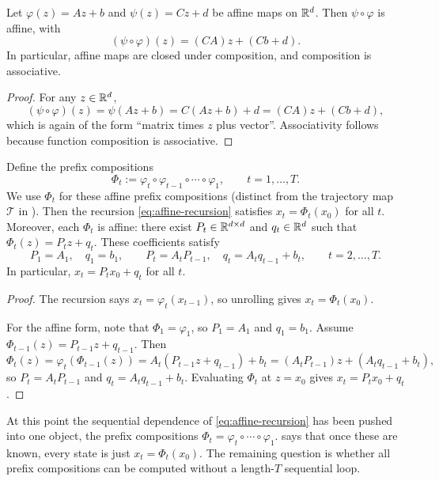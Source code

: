 \documentclass[11pt]{article}
\begin{document}
\begin{lemma}
\label{lem:affine-composition}
Let $\varphi(z)=Az+b$ and $\psi(z)=Cz+d$ be affine maps on $\mathbb{R}^d$.
Then $\psi\circ\varphi$ is affine, with
\[
(\psi\circ\varphi)(z) = (CA)z + (Cb+d).
\]
In particular, affine maps are closed under composition, and composition is associative.
\end{lemma}

\begin{proof}
For any $z\in\mathbb{R}^d$,
\[
(\psi\circ\varphi)(z)
=\psi(Az+b)
=C(Az+b)+d
=(CA)z+(Cb+d),
\]
which is again of the form ``matrix times $z$ plus vector''.
Associativity follows because function composition is associative.%
\end{proof}

\begin{proposition}
\label{prop:affine-prefix}
Define the prefix compositions
\[
\Phi_t := \varphi_t\circ\varphi_{t-1}\circ\cdots\circ\varphi_1,
\qquad t=1,\dots,T.
\]
We use $\Phi_t$ for these affine prefix compositions (distinct from the trajectory map $\mathcal{T}$ in ).
Then the recursion \eqref{eq:affine-recursion} satisfies $x_t=\Phi_t(x_0)$ for all $t$.
Moreover, each $\Phi_t$ is affine: there exist $P_t\in\mathbb{R}^{d\times d}$ and $q_t\in\mathbb{R}^d$ such that $\Phi_t(z)=P_t z+q_t$.
These coefficients satisfy
\[
P_1=A_1,\quad q_1=b_1,
\qquad
P_t=A_tP_{t-1},\quad q_t=A_tq_{t-1}+b_t,\qquad t=2,\dots,T.
\]
In particular, $x_t=P_t x_0+q_t$ for all $t$.
\end{proposition}

\begin{proof}
The recursion says $x_t=\varphi_t(x_{t-1})$, so unrolling gives $x_t=\Phi_t(x_0)$.

For the affine form, note that $\Phi_1=\varphi_1$, so $P_1=A_1$ and $q_1=b_1$.
Assume $\Phi_{t-1}(z)=P_{t-1}z+q_{t-1}$.
Then
\[
\Phi_t(z)
=\varphi_t(\Phi_{t-1}(z))
=A_t(P_{t-1}z+q_{t-1})+b_t
=(A_tP_{t-1})z+(A_tq_{t-1}+b_t),
\]
so $P_t=A_tP_{t-1}$ and $q_t=A_tq_{t-1}+b_t$.
Evaluating $\Phi_t$ at $z=x_0$ gives $x_t=P_t x_0+q_t$.%
\end{proof}

At this point the sequential dependence of \eqref{eq:affine-recursion} has been pushed into one object, the prefix compositions $\Phi_t=\varphi_t\circ\cdots\circ\varphi_1$.
 says that once these are known, every state is just $x_t=\Phi_t(x_0)$.
The remaining question is whether all prefix compositions can be computed without a length-$T$ sequential loop.
\end{document}
